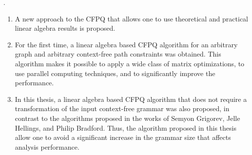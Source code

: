 {\novelty.}
\begin{enumerate}[beginpenalty=10000] %
	
	\item A new approach to the CFPQ that allows one to use theoretical and practical linear algebra results is proposed.
	
	\item For the first time, a linear algebra based CFPQ algorithm for an arbitrary graph and arbitrary context-free path constraints was obtained. This algorithm makes it possible to apply a wide class of matrix optimizations, to use parallel computing techniques, and to significantly improve the performance.
	
	\item In this thesis, a linear algebra based CFPQ algorithm that does not require a transformation of the input context-free grammar was also proposed, in contrast to the algorithms proposed in the works of Semyon Grigorev, Jelle Hellings, and Philip Bradford. Thus, the algorithm proposed in this thesis allow one to avoid a significant increase in the grammar size that affects analysis performance.
	
	
\end{enumerate}

